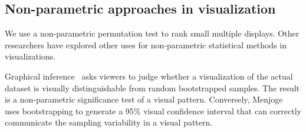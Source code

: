 \subsection{Non-parametric approaches in visualization}
We use a non-parametric permutation test to rank small multiple displays. Other researchers have explored other uses for non-parametric statistical methods in visualizations.

Graphical inference~\cite{Buja2009, Wickham2013, Majumder2013} asks viewers to judge whether a visualization of the actual dataset is visually distinguishable from random bootstrapped samples. The result is a non-parametric significance test of a visual pattern. Conversely, Menjoge~\cite{Menjoge2010} uses bootstrapping to generate a 95\% visual confidence interval that can correctly communicate the sampling variability in a visual pattern. 

